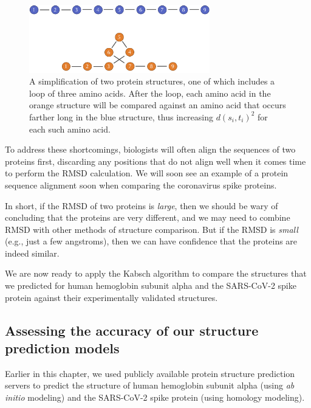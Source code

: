 \begin{figure}[h]
	\centering
	\mySfFamily
	\includegraphics[width = 0.7\textwidth]{../images/RMSD_weakness_loop.png}
	\caption{A simplification of two protein structures, one of which includes a loop of three amino acids. After the loop, each amino acid in the orange structure will be compared against an amino acid that occurs farther long in the blue structure, thus increasing $d(s_{i}, t_{i})^2$ for each such amino acid.}
	\label{fig:RMSD_weakness_loop}
\end{figure}

To address these shortcomings, biologists will often align the sequences of two proteins first, discarding any positions that do not align well when it comes time to perform the RMSD calculation. We will soon see an example of a protein sequence alignment soon when comparing the coronavirus spike proteins.

In short, if the RMSD of two proteins is \textit{large}, then we should be wary of concluding that the proteins are very different, and we may need to combine RMSD with other methods of structure comparison. But if the RMSD is \textit{small} (e.g., just a few angstroms), then we can have confidence that the proteins are indeed similar.

We are now ready to apply the Kabsch algorithm to compare the structures that we predicted for human hemoglobin subunit alpha and the SARS-CoV-2 spike protein against their experimentally validated structures. 

\FloatBarrier
{}
\subsection{Assessing the accuracy of our structure prediction models}

Earlier in this chapter, we used publicly available protein structure prediction servers to predict the structure of human hemoglobin subunit alpha (using \textit{ab initio} modeling) and the SARS-CoV-2 spike protein (using homology modeling).

